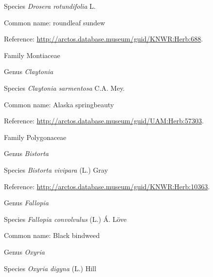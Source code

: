 \documentclass[9pt, article]{memoir}
\begin{document}
\begin{multicols}{2}
\vspace{6pt}\noindent\hspace{36pt}Species \textit{Drosera rotundifolia} L.


Common name: roundleaf sundew

Reference: 
\url{http://arctos.database.museum/guid/KNWR:Herb:688}.

\vspace{6pt}\noindent\hspace{24pt}Family Montiaceae


\vspace{6pt}\noindent\hspace{30pt}Genus \textit{Claytonia}


\vspace{6pt}\noindent\hspace{36pt}Species \textit{Claytonia sarmentosa} C.A. Mey.


Common name: Alaska springbeauty

Reference: 
\url{http://arctos.database.museum/guid/UAM:Herb:57303}.

\vspace{6pt}\noindent\hspace{24pt}Family Polygonaceae


\vspace{6pt}\noindent\hspace{30pt}Genus \textit{Bistorta}


\vspace{6pt}\noindent\hspace{36pt}Species \textit{Bistorta vivipara} (L.) Gray


Reference: 
\url{http://arctos.database.museum/guid/KNWR:Herb:10363}.

\vspace{6pt}\noindent\hspace{30pt}Genus \textit{Fallopia}


\vspace{6pt}\noindent\hspace{36pt}Species \textit{Fallopia convolvulus} (L.) Á. Löve


Common name: Black bindweed

\vspace{6pt}\noindent\hspace{30pt}Genus \textit{Oxyria}


\vspace{6pt}\noindent\hspace{36pt}Species \textit{Oxyria digyna} (L.) Hill



\end{multicols}
\end{document}
